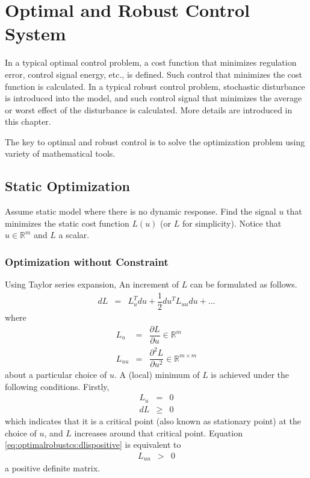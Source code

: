 \chapter{Optimal and Robust Control System} \label{ch:optimalrobustcs}

In a typical optimal control problem, a cost function that minimizes regulation error, control signal energy, etc., is defined. Such control that minimizes the cost function is calculated. In a typical robust control problem, stochastic disturbance is introduced into the model, and such control signal that minimizes the average or worst effect of the disturbance is calculated. More details are introduced in this chapter.

The key to optimal and robust control is to solve the optimization problem using variety of mathematical tools.

\section{Static Optimization}

Assume static model where there is no dynamic response. Find the signal $u$ that minimizes the static cost function $L(u)$ (or $L$ for simplicity). Notice that $u\in\mathbb{R}^m$ and $L$ a scalar. 

\subsection{Optimization without Constraint}

Using Taylor series expansion, An increment of $L$ can be formulated as follows.
\begin{eqnarray}
	dL &=& L_u^Tdu + \dfrac{1}{2}du^TL_{uu}du + \ldots \nonumber
\end{eqnarray}
where
\begin{eqnarray}
	L_u &=& \dfrac{\partial L}{\partial u} \in \mathbb{R}^m \nonumber \\
	L_{uu} &=& \dfrac{\partial^2 L}{\partial u^2} \in \mathbb{R}^{m\times m}
\end{eqnarray}
about a particular choice of $u$. A (local) minimum of $L$ is achieved under the following conditions. Firstly,
\begin{eqnarray}
	L_u &=& 0 \nonumber \\
	dL &\geq& 0 \label{eq:optimalrobustcs:dlispositive}
\end{eqnarray}
which indicates that it is a critical point (also known as stationary point) at the choice of $u$, and $L$ increases around that critical point. Equation \eqref{eq:optimalrobustcs:dlispositive} is equivalent to
\begin{eqnarray}
	L_{uu} &>& 0 \nonumber
\end{eqnarray}
a positive definite matrix.

